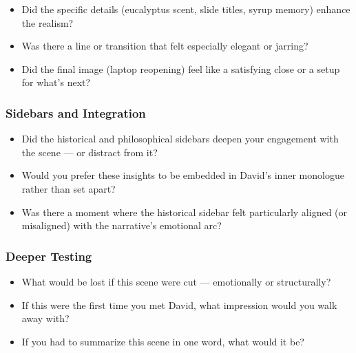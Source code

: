 \begin{itemize}
  \item Did the specific details (eucalyptus scent, slide titles, syrup memory) enhance the realism?
  \item Was there a line or transition that felt especially elegant or jarring?
  \item Did the final image (laptop reopening) feel like a satisfying close or a setup for what’s next?
\end{itemize}

\subsubsection*{Sidebars and Integration}

\begin{itemize}
  \item Did the historical and philosophical sidebars deepen your engagement with the scene — or distract from it?
  \item Would you prefer these insights to be embedded in David’s inner monologue rather than set apart?
  \item Was there a moment where the historical sidebar felt particularly aligned (or misaligned) with the narrative’s emotional arc?
\end{itemize}

\subsubsection*{Deeper Testing}

\begin{itemize}
  \item What would be lost if this scene were cut — emotionally or structurally?
  \item If this were the first time you met David, what impression would you walk away with?
  \item If you had to summarize this scene in one word, what would it be?
\end{itemize}